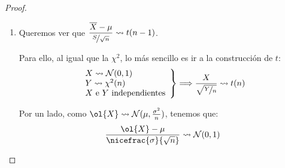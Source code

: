 \begin{coro}
\begin{proof}
\begin{enumerate}
            Veamos la función generatriz de momentos de $A$ y $C$:
            \begin{itemize}
                \item Para $A$, tenemos que $A\rightsquigarrow \chi^2(n)$, por lo que:
                \begin{equation*}
                    M_A(t) = \dfrac{1}{{(1-2t)}^{\nicefrac{n}{2}}} \qquad t < \frac{1}{2}
                \end{equation*}
                \item Para $C$, tenemos que $C\rightsquigarrow \chi^2(1)$, por lo que:
                \begin{equation*}
                    M_C(t) = \dfrac{1}{{(1-2t)}^{\frac{1}{2}}} \qquad t < \frac{1}{2}
                \end{equation*}
            \end{itemize}

            Por tanto, tenemos que:
            \begin{equation*}
                M_B(t) = \dfrac{M_A(t)}{M_C(t)} = \dfrac{\dfrac{1}{{(1-2t)}^{\frac{n}{2}}}}{\dfrac{1}{{(1-2t)}^{\frac{1}{2}}}} = \dfrac{1}{{(1-2t)}^{\frac{n-1}{2}}} \qquad  t<\frac{1}{2}
            \end{equation*}
            De aquí, deducimos que $B\rightsquigarrow \chi^2(n-1)$.
        \item Queremos ver que $\dfrac{\overline{X}-\mu}{\nicefrac{S}{\sqrt{n}}}\rightsquigarrow t(n-1)$.

            Para ello, al igual que la $\chi^2$, lo más sencillo es ir a la construcción de $t$:
            \begin{equation*}
                \left.\begin{array}{l}
                        X\rightsquigarrow \mathcal{N}(0,1) \\
                        Y \rightsquigarrow\chi^2(n) \\
                        \text{$X$ e $Y$ independientes}
                \end{array}\right\}\Longrightarrow \dfrac{X}{\sqrt{\nicefrac{Y}{n}}} \rightsquigarrow t(n)
            \end{equation*}
            
            Por un lado, como $\ol{X}\rightsquigarrow \cc{N}(\mu, \frac{\sigma^2}{n})$, tenemos que:
            \begin{equation*}
                \dfrac{\ol{X}-\mu}{\nicefrac{\sigma}{\sqrt{n}}} \rightsquigarrow \cc{N}(0,1)
            \end{equation*}


\end{enumerate}
\end{proof}
\end{coro}
